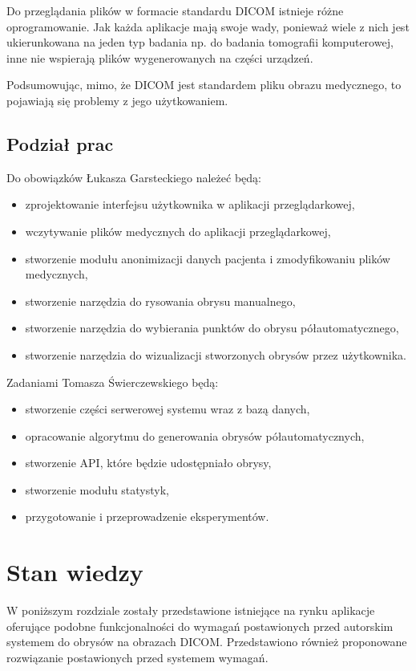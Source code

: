 \documentclass[a4paper,11pt,twoside,openright]{report}
\theoremstyle{definition}
\begin{document}
Do przeglądania plików w formacie standardu DICOM istnieje różne oprogramowanie. Jak każda aplikacje mają swoje wady, ponieważ wiele z nich jest ukierunkowana na jeden typ badania np. do badania tomografii komputerowej, inne nie wspierają plików wygenerowanych na części urządzeń.

Podsumowując, mimo, że DICOM jest standardem pliku obrazu medycznego, to pojawiają się problemy z jego użytkowaniem.

\section {Podział prac}

Do obowiązków Łukasza Garsteckiego należeć będą:

\begin{itemize}[noitemsep]
\item zprojektowanie interfejsu użytkownika w aplikacji przeglądarkowej,
\item wczytywanie plików medycznych do aplikacji przeglądarkowej,
\item stworzenie modułu anonimizacji danych pacjenta i zmodyfikowaniu plików medycznych,
\item stworzenie narzędzia do rysowania obrysu manualnego,
\item stworzenie narzędzia do wybierania punktów do obrysu półautomatycznego,
\item stworzenie narzędzia do wizualizacji stworzonych obrysów przez użytkownika.
\end{itemize}

Zadaniami Tomasza Świerczewskiego będą:
\begin{itemize}[noitemsep]
\item stworzenie części serwerowej systemu wraz z bazą danych,
\item opracowanie algorytmu do generowania obrysów półautomatycznych,
\item stworzenie API, które będzie udostępniało obrysy,
\item stworzenie modułu statystyk,
\item przygotowanie i przeprowadzenie eksperymentów.
\end{itemize}


\chapter {Stan wiedzy}

W poniższym rozdziale zostały przedstawione istniejące na rynku aplikacje oferujące podobne funkcjonalności do wymagań postawionych przed autorskim systemem do obrysów na obrazach DICOM. Przedstawiono również proponowane rozwiązanie postawionych przed systemem wymagań.
\end{document}
